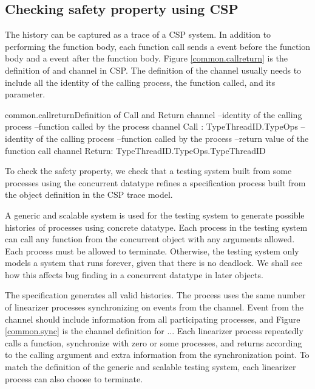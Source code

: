 \documentclass{article}
\begin{document}
\subsection{Checking safety property using CSP} 
The history can be captured as a trace of a CSP system. In addition to performing the function body, each function call sends a  event before the function body and a  event after the function body. Figure \ref{common.callreturn} is the definition of  and  channel in CSP. The definition of the channel usually needs to include all the identity of the calling process, the function called, and its parameter. 

\begin{cspinline}{common.callreturn}{Definition of Call and Return channel}
--identity of the calling process
--function called by the process
channel Call : TypeThreadID.TypeOps
--identity of the calling process
--function called by the process
--return value of the function call
channel Return: TypeThreadID.TypeOps.TypeThreadID
\end{cspinline}

To check the safety property, we check that a testing system built from some processes using the concurrent datatype refines a specification process built from the object definition in the CSP trace model.

A generic and scalable system is used for the testing system to generate possible histories of processes using concrete datatype. Each process in the testing system can call any function from the concurrent object with any arguments allowed. Each process must be allowed to terminate. Otherwise, the testing system only models a system that runs forever, given that there is no deadlock. We shall see how this affects bug finding in a concurrent datatype in later objects.

The specification generates all valid histories. The process uses the same number of linearizer processes synchronizing on events from the  channel. Event from the  channel should include information from all participating processes, and Figure \ref{common.sync} is the  channel definition for ... Each linearizer process repeatedly calls a function, synchronize with zero or some processes, and returns according to the calling argument and extra information from the synchronization point. To match the definition of the generic and scalable testing system, each linearizer process can also choose to terminate. 
\end{document}
